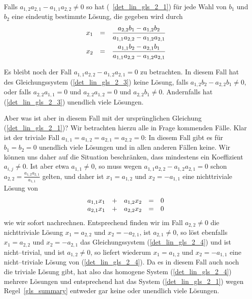 Falls $a_{1,2} a_{2,1} - a_{1,1} a_{2,2} \neq 0$ so hat (~\ref{det_lin_gls_2_1}) für jede Wahl von $b_1$ 
und $b_2$ eine eindeutig bestimmte Lösung, die gegeben wird durch
  	$$ \begin{array} {l c l}
   	x_1 & = & \dfrac {a_{2,2} b_1 - a_{1,2} b_2}{a_{1,1} a_{2,2} - a_{1,2} a_{2,1}} \\[1.0em]
   	x_2 & = & \dfrac {a_{1,1} b_2 - a_{2,1} b_1}{a_{1,1} a_{2,2} - a_{1,2} a_{2,1}}
  	\end{array} $$

Es bleibt noch der Fall $a_{1,1} a_{2,2} - a_{1,2} a_{2,1} = 0$ zu betrachten. In diesem Fall hat des 
Gleichungssystem (\ref{det_lin_gls_2_3}) keine Lösung, falls $a_{1,2} b_2 - a_{2,2} b_1 \neq 0$, oder 
falls $a_{2,2}a_{1,1} = 0$ und $a_{2,2} a_{1,2} = 0$ und $a_{2,2} b_1 \neq 0$. Andernfalls 
hat (\ref{det_lin_gls_2_3}) unendlich viele Lösungen. 

Aber was ist aber in diesem Fall mit der ursprünglichen Gleichung (\ref{det_lin_gls_2_1})? 
Wir betrachten hierzu alle in Frage kommenden Fälle. Klar ist der triviale Fall $a_{1,1} = 
a_{1,2} = a_{2,1} = a_{2,2} = 0$: In diesem Fall gibt es für $b_1 = b_2 = 0$ unendlich viele Lösungen und
in allen anderen Fällen keine. Wir können uns daher auf die Situation beschränken, dass mindestens ein 
Koeffizient $a_{i,j} \neq 0$. Ist aber etwa $a_{1,1} \neq 0$, so muss wegen $a_{1,1} a_{2,2} - 
a_{1,2} a_{2,1} = 0$ schon $a_{2,2} = \frac {a_{1,2} a_{2,1}}{a_{1,1}}$ gelten, und daher ist $x_1 = a_{1,2}$ 
und $x_2 = - a_{1,1} $ eine nichttriviale Lösung von 
  	\begin{equation}\label{det_lin_gls_2_4} \begin{array} {l c l c l c l}
  	a_{1,1} x_1 & + & a_{1,2} x_2 & = & 0 \\
  	a_{2,1} x_1 & + & a_{2,2} x_2 & = & 0
  	\end{array} \end{equation}
wie wir sofort nachrechnen. Entsprechend finden wir im Fall $a_{2,2} \neq 0$ die nichttriviale Lösung 
$x_1 = a_{2,2}$ und $x_2 = -a_{2,1}$, ist $a_{2,1} \neq 0$, so löst ebenfalls $x_1 = a_{2,2}$ 
und $x_2 = -a_{2,1}$ das Gleichungssystem (\ref{det_lin_gls_2_4}) und ist nicht--trivial, und 
ist $a_{1,2} \neq 0$, so liefert wiederum $x_1 = a_{1,2}$ 
und $x_2 = -a_{1,1}$ eine nicht--triviale Lösung von (\ref{det_lin_gls_2_4}). 
Da es in diesem 
Fall auch noch die triviale Lösung gibt, hat also das homogene System (\ref{det_lin_gls_2_4}) mehrere 
Lösungen und entsprechend hat das System (\ref{det_lin_gls_2_1}) wegen Regel~\ref{gls_summary} entweder 
gar keine oder unendlich viele Lösungen. 

